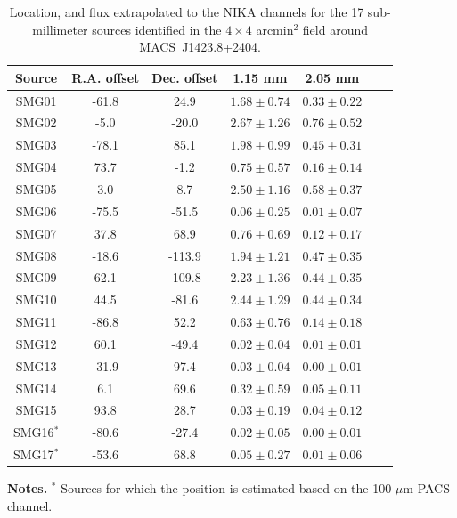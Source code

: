 \documentclass[twocolumn,traditabstract]{aa}
\begin{document}
\begin{table}[h]
\caption{Location, and flux extrapolated to the NIKA channels for the 17 sub-millimeter sources identified in the $4 \times 4$ arcmin$^2$ field around \mbox{MACS~J1423.8+2404}.}
\begin{center}
\begin{tabular}{ccccccc}
\hline
\hline
Source &  R.A. offset & Dec. offset & 1.15 mm & 2.05 mm\\
\hline
SMG01 &    -61.8 &     24.9 & $    1.68 \pm     0.74$ & $    0.33 \pm     0.22$ \\
SMG02 &     -5.0 &    -20.0 & $    2.67 \pm     1.26$ & $    0.76 \pm     0.52$ \\
SMG03 &    -78.1 &     85.1 & $    1.98 \pm     0.99$ & $    0.45 \pm     0.31$ \\
SMG04 &     73.7 &     -1.2 & $    0.75 \pm     0.57$ & $    0.16 \pm     0.14$ \\
SMG05 &      3.0 &      8.7 & $    2.50 \pm     1.16$ & $    0.58 \pm     0.37$ \\
SMG06 &    -75.5 &    -51.5 & $    0.06 \pm     0.25$ & $    0.01 \pm     0.07$ \\
SMG07 &     37.8 &     68.9 & $    0.76 \pm     0.69$ & $    0.12 \pm     0.17$ \\
SMG08 &    -18.6 &   -113.9 & $    1.94 \pm     1.21$ & $    0.47 \pm     0.35$ \\
SMG09 &     62.1 &   -109.8 & $    2.23 \pm     1.36$ & $    0.44 \pm     0.35$ \\
SMG10 &     44.5 &    -81.6 & $    2.44 \pm     1.29$ & $    0.44 \pm     0.34$ \\
SMG11 &    -86.8 &     52.2 & $    0.63 \pm     0.76$ & $    0.14 \pm     0.18$ \\
SMG12 &     60.1 &    -49.4 & $    0.02 \pm     0.04$ & $    0.01 \pm     0.01$ \\
SMG13 &    -31.9 &     97.4 & $    0.03 \pm     0.04$ & $    0.00 \pm     0.01$ \\
SMG14 &      6.1 &     69.6 & $    0.32 \pm     0.59$ & $    0.05 \pm     0.11$ \\
SMG15 &     93.8 &     28.7 & $    0.03 \pm     0.19$ & $    0.04 \pm     0.12$ \\
SMG16$^*$ &    -80.6 &    -27.4 & $    0.02 \pm     0.05$ & $    0.00 \pm     0.01$ \\
SMG17$^*$ &    -53.6 &     68.8 & $    0.05 \pm     0.27$ & $    0.01 \pm     0.06$ \\
\hline
\end{tabular}
\end{center}
{\small {\bf Notes.} $^*$ Sources for which the position is estimated based on the 100 $\mu$m PACS channel.}
\label{tab:IR_ps2}
\end{table}
\end{document}

